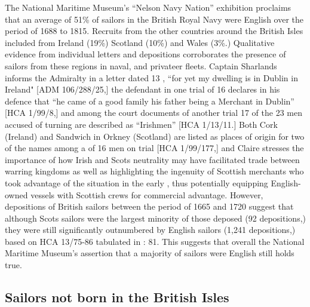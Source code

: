 The National Maritime Museum’s “Nelson Navy Nation” exhibition proclaims that an average of 51\% of sailors in the British Royal Navy were English over the period of 1688 to 1815. Recruits from the other countries around the British Isles included  from Ireland (19\%) Scotland (10\%) and Wales (3\%.) Qualitative evidence from individual letters and depositions corroborates the presence of sailors from these regions in naval,  and privateer fleets. Captain Sharlands informs the Admiralty in a letter dated 13 \citealt{April1673}, “for yet my dwelling is in Dublin in Ireland" [ADM 106/288/25,] the defendant in one trial of 16 \citealt{August1727} declares in his defence that “he came of a good family his father being a Merchant in Dublin” [HCA 1/99/8,] and among the court documents of another trial 17 of the 23 men accused of turning  are described as “Irishmen” [HCA 1/13/11.] Both Cork (Ireland) and Sandwich in Orkney (Scotland) are listed as places of origin for two of the names among a  of 16 men on trial [HCA 1/99/177,] and Claire \citet{McLoughlin2015} stresses the importance of how Irish and Scots neutrality may have facilitated trade between warring kingdoms as well as highlighting the ingenuity of Scottish merchants who took advantage of the situation in the early , thus potentially equipping English-owned vessels with Scottish crews for commercial advantage. However, depositions of British sailors between the period of 1665 and 1720 suggest that although Scots sailors were the largest minority of those deposed (92 depositions,) they were still significantly outnumbered by English sailors (1,241 depositions,) based on HCA 13/75-86 tabulated in \citealt{Earle1993}: 81. This suggests that overall the National Maritime Museum’s assertion that a majority of sailors were English still holds true.  

\subsection{{Sailors not born in the British Isles}}\label{sec:3.9.3}

